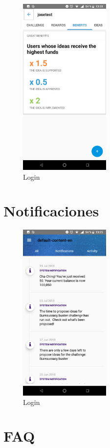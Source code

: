\begin{figure}[!h]
	\begin{center}
		\includegraphics[width=0.4\textwidth]{./img/anexo1/ver_desafio_beneficios.png}
		\caption{Login}
		\label{fig:ver_desafio_inicio_beneficios}
	\end{center}
\end{figure}


\section{Notificaciones}

\begin{figure}[!h]
	\begin{center}
		\includegraphics[width=0.4\textwidth]{./img/anexo1/notificaciones_all.png}
		\caption{Login}
		\label{fig:notificaciones}
	\end{center}
\end{figure}

\section{FAQ}

